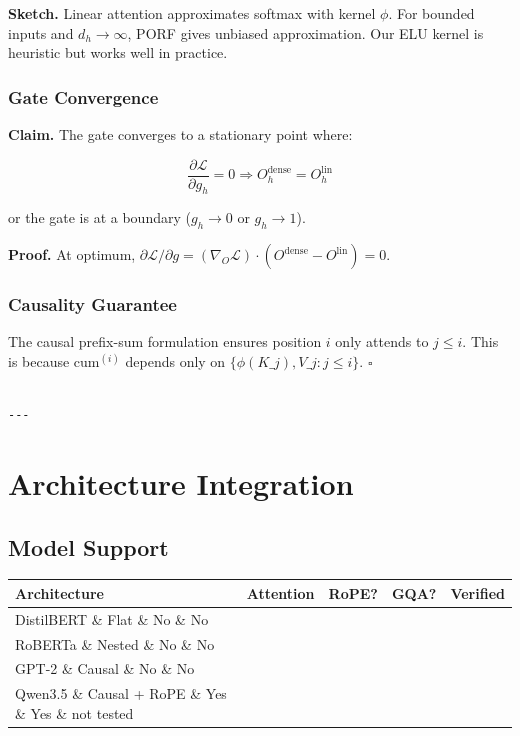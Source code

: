 \textbf{Sketch.} Linear attention approximates softmax with kernel $\phi$. For 
bounded inputs and $d_h \to \infty$, PORF gives unbiased approximation. Our 
ELU kernel is heuristic but works well in practice.

\subsubsection{Gate Convergence}

\textbf{Claim.} The gate converges to a stationary point where:

\[
\frac{\partial \mathcal{L}}{\partial g_h} = 0 \Rightarrow O^\text{dense}_h = O^\text{lin}_h
\]

or the gate is at a boundary ($g_h \to 0$ or $g_h \to 1$).

\textbf{Proof.} At optimum, $\partial \mathcal{L} / \partial g = (\nabla_O \mathcal{L}) \cdot (O^\text{dense} - O^\text{lin}) = 0$. 

\subsubsection{Causality Guarantee}

The causal prefix-sum formulation ensures position $i$ only attends to 
$j \le i$. This is because $\text{cum}^{(i)}$ depends only on $\{\phi(K\_j), 
V\_j : j \le i\}$. $\square$
\begin{lstlisting}

---
\end{lstlisting}


\section{Architecture Integration}

\subsection{Model Support}

\begin{table}[H]
\centering
\small
\begin{tabular}{lllll}
\toprule
\textbf{Architecture} & \textbf{Attention} & \textbf{RoPE?} & \textbf{GQA?} & \textbf{Verified} \\
\midrule
DistilBERT \& Flat \& No \& No &  \\
RoBERTa \& Nested \& No \& No &  \\
GPT-2 \& Causal \& No \& No &  \\
Qwen3.5 \& Causal + RoPE \& Yes \& Yes \& not tested \\
\bottomrule
\end{tabular}
\end{table}

